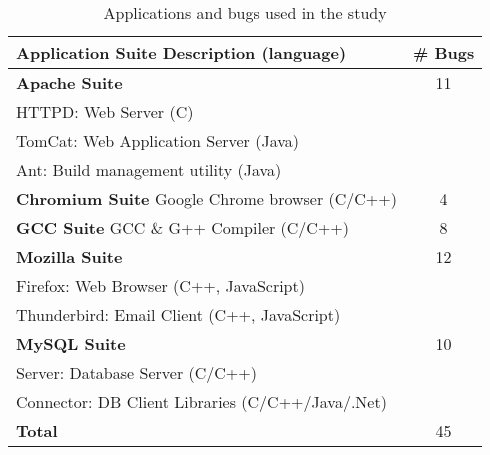 \begin{table}[h!]
\small{
\centering
\begin{tabular}{@{\hspace{3pt}}l@{\hspace{3pt}}|@{\hspace{3pt}}c@{\hspace{3pt}}}
\hline
Application Suite Description (language) & \# Bugs \\
\hline                            
{\bf Apache Suite} 	 & 11\\
{HTTPD:	Web Server (C)	}& \\
{TomCat:  Web Application Server (Java)}& \\
{Ant:	Build management utility (Java)}& \\
\hline                            
{\bf Chromium Suite} Google Chrome browser (C/C++) & 4\\
\hline
{\bf GCC Suite}  GCC \& G++ Compiler (C/C++)     & 8\\
\hline
{\bf Mozilla Suite}  & 12\\
{Firefox: Web Browser (C++, JavaScript)}& 	\\
{Thunderbird: Email Client (C++, JavaScript)}& \\
\hline
{\bf MySQL Suite}     & 10	\\
{Server: Database Server (C/C++)}&  	\\
{Connector: DB Client Libraries (C/C++/Java/.Net)} &  	\\
\hline
{\bf Total}	   & 45 \\
\hline
\end{tabular}
}
\caption{Applications and bugs used in the study}
\label{tab:app_bug}
\end{table}


